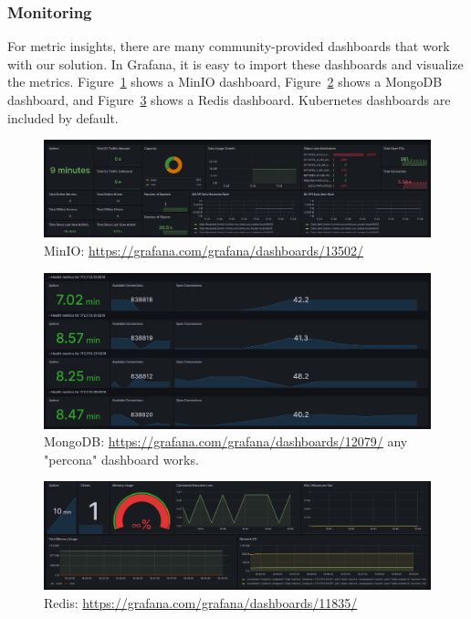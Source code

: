 \documentclass{report}
\begin{document}
    \subsubsection{Monitoring}
    For metric insights, there are many community-provided dashboards that work with our solution. In Grafana, it is easy to import these dashboards and visualize the metrics. Figure~\ref{fig:dashboard-minio} shows a MinIO dashboard, Figure~\ref{fig:dashboard-mongodb} shows a MongoDB dashboard, and Figure~\ref{fig:dashboard-redis} shows a Redis dashboard. Kubernetes dashboards are included by default.
    \begin{figure}[h]
        \centering
        \includegraphics[width=\textwidth]{images/dashboard-minio}
        \caption{MinIO: \url{https://grafana.com/grafana/dashboards/13502/}}
        \label{fig:dashboard-minio}
    \end{figure}
    \begin{figure}[h]
        \centering
        \includegraphics[width=\textwidth]{images/dashboard-mongodb}
        \caption{MongoDB: \url{https://grafana.com/grafana/dashboards/12079/} any "percona" dashboard works.}
        \label{fig:dashboard-mongodb}
    \end{figure}
    \begin{figure}[h]
        \centering
        \includegraphics[width=\textwidth]{images/dashboard-redis}
        \caption{Redis: \url{https://grafana.com/grafana/dashboards/11835/}}
        \label{fig:dashboard-redis}
    \end{figure}
\end{document}
